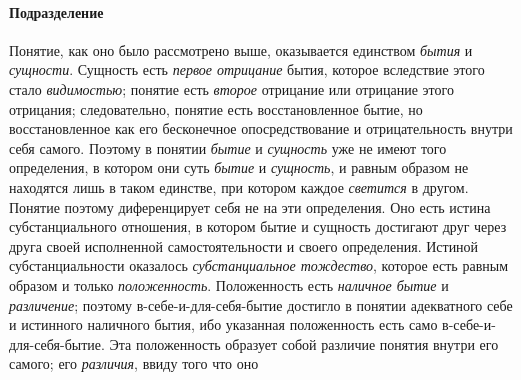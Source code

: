 \documentclass[twoside]{article}
\begin{document}
{{\paragraph[Подразделение]{Подразделение}
Понятие, как оно было рассмотрено выше, оказывается единством
{\em бытия} и
{\em сущности}. Сущность
есть {\em первое отрицание}
бытия, которое вследствие этого стало
{\em видимостью}; понятие
есть {\em второе}
отрицание или отрицание этого отрицания; следовательно,
понятие есть восстановленное бытие, но восстановленное как его бесконечное
опосредствование и отрицательность внутри себя самого. Поэтому в понятии
{\em бытие} и
{\em сущность} уже не
имеют того определения, в котором они суть
{\em бытие} и
{\em сущность}, и равным
образом не находятся лишь в таком единстве, при котором каждое
{\em светится} в другом.
Понятие поэтому диференцирует себя не на эти определения. Оно есть истина
субстанциального отношения, в котором бытие и сущность достигают друг через
друга своей исполненной самостоятельности и своего определения. Истиной
субстанциальности оказалось
{\em субстанциальное тождество},
которое есть равным образом и только
{\em положенность}.
Положенность есть
{\em наличное бытие} и
{\em различение}; поэтому
в-себе-и-для-себя-бытие достигло в понятии адекватного себе и истинного
наличного бытия, ибо указанная положенность есть само
в-себе-и-для-себя-бытие. Эта положенность образует собой различие понятия
внутри его самого; его {\em различия},
ввиду того что
оно~}}
\end{document}
